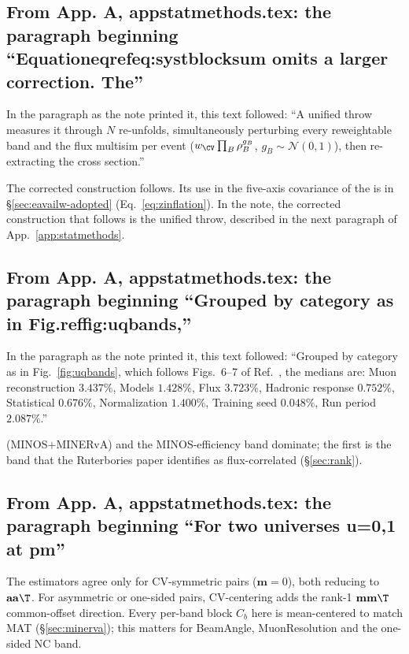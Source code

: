 \subsection{From App. A, appstatmethods.tex: the paragraph beginning ``Equationeqrefeq:systblocksum omits a larger correction. The''}
In the paragraph as the note printed it, this text followed: ``A unified throw measures it through $N$ re-unfolds, simultaneously perturbing every reweightable band and the flux multisim per event ($w_{\CV}\prod_B\rho_B^{g_B}$, $g_B\sim\mathcal N(0,1)$), then re-extracting the cross section.''\par
The corrected construction follows. Its use in the five-axis covariance of the \resFiveAxis{} is in \S\ref{sec:eavailw-adopted} (Eq.~\eqref{eq:zinflation}).
In the note, the corrected construction that follows is the unified throw, described in the next paragraph of App.~\ref{app:statmethods}.\par

\subsection{From App. A, appstatmethods.tex: the paragraph beginning ``Grouped by category as in Fig.reffig:uqbands,''}
In the paragraph as the note printed it, this text followed: ``Grouped by category as in Fig.~\ref{fig:uqbands}, which follows Figs.~6--7 of Ref.~\cite{MINERvA:2021owq}, the medians are: Muon reconstruction $3.437\%$, Models $1.428\%$, Flux $3.723\%$, Hadronic response $0.752\%$, Statistical $0.676\%$, Normalization $1.400\%$, Training seed $0.048\%$, Run period $2.087\%$.''\par
(MINOS$+$MINERvA) and the MINOS-efficiency band dominate; the first is the band that the Ruterbories paper identifies as flux-correlated (\S\ref{sec:rank}).

\subsection{From App. A, appstatmethods.tex: the paragraph beginning ``For two universes u=0,1 at pm''}
The estimators agree only for CV-symmetric pairs ($\mathbf{m}=0$), both reducing to $\mathbf{a}\mathbf{a}\T$. For asymmetric or one-sided pairs, CV-centering adds the rank-1 $\mathbf{m}\mathbf{m}\T$ common-offset direction. Every per-band block $C_{b}$ here is mean-centered to match MAT (\S\ref{sec:minerva}); this matters for BeamAngle, MuonResolution and the one-sided NC band.

